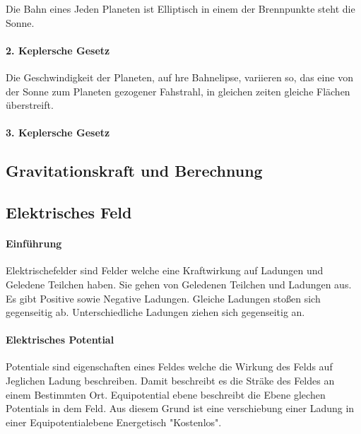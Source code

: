 \documentclass{article}
\begin{document}
            		Die Bahn eines Jeden Planeten ist Elliptisch in einem der Brennpunkte steht die Sonne.
            		
            	\paragraph{2. Keplersche Gesetz \newline}
            	
            		Die Geschwindigkeit der Planeten, auf hre Bahnelipse, variieren so, das eine von der Sonne zum Planeten gezogener Fahstrahl, in gleichen zeiten gleiche Flächen überstreift. 
            		
          		\paragraph{3. Keplersche Gesetz \newline}
          		
          			
          			
        
        	\subsection{Gravitationskraft und Berechnung}
        
        \subsection{Elektrisches Feld}
        
        	\paragraph{Einführung \newline}
        	
        		Elektrischefelder sind Felder welche eine Kraftwirkung auf Ladungen und Geledene Teilchen haben. Sie gehen von Geledenen Teilchen und Ladungen aus. Es gibt Positive sowie Negative Ladungen. Gleiche Ladungen stoßen sich gegenseitig ab. Unterschiedliche Ladungen ziehen sich gegenseitig an. 
        		
       		\paragraph{Elektrisches Potential}
       		
       			Potentiale sind eigenschaften eines Feldes welche die Wirkung des Felds auf Jeglichen Ladung beschreiben. Damit beschreibt es die Sträke des Feldes an einem Bestimmten Ort.
       			Equipotential ebene beschreibt die Ebene glechen Potentials in dem Feld. Aus diesem Grund ist eine verschiebung einer Ladung in einer Equipotentialebene Energetisch "Kostenlos". 
        
\end{document}
